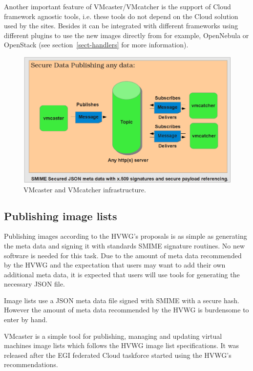 \documentclass{cai}
\begin{document}
Another important feature of VMcaster/VMcatcher is the support of Cloud framework agnostic tools, i.e. these tools do not depend on the Cloud solution used by the sites. Besides it can be integrated with different frameworks using different plugins to use the new images directly from for example, OpenNebula or OpenStack (see section~\ref{sect-handlers} for more information).

\begin{figure}
\centering
\includegraphics[width=1\textwidth]{vmcaster_vmcatcher.png}
\caption{VMcaster and VMcatcher infrastructure.}
\label{fig:infrastructure}
\end{figure}

\subsection{Publishing image lists}
Publishing images according to the HVWG's proposals is as simple as generating the meta data and signing it with standards SMIME signature routines. No new software is needed for this task. Due to the amount of meta data recommended by the HVWG and the expectation that users may want to add their own additional meta data, it is expected that users will use tools for generating the necessary JSON file.

Image lists use a JSON meta data file signed with SMIME  with a secure hash. However the amount of meta data recommended by the HVWG is burdensome to enter by hand.
 
VMcaster is a simple tool for publishing, managing and updating virtual machines image lists which follows the HVWG image list specifications. It was released after the EGI federated Cloud taskforce started using the HVWG's recommendations. 
\end{document}
